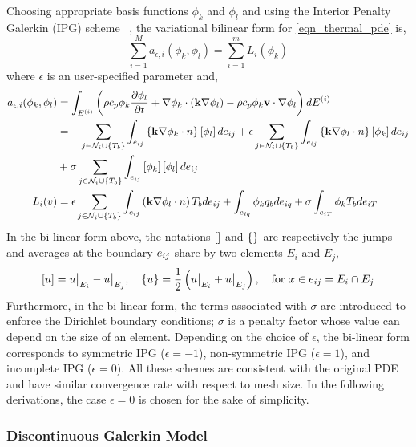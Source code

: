 Choosing appropriate basis functions $\phi_k$ and $\phi_l$ and using the Interior Penalty Galerkin (IPG) scheme ~\cite{Cohen and pernet 2018}, the variational bilinear form for \cref{eqn_thermal_pde} is,
\begin{equation}
    \sum_{i=1}^{M}a_{\epsilon,i}(\phi_k,\phi_l) = \sum_{i=1}^{m}L_i(\phi_k)
\end{equation}
where $\epsilon$ is an user-specified parameter and,
\begin{subequations}
    \begin{align}
        a_{\epsilon,i}(\phi_k,\phi_l) &= \int_{E^{(i)}}\left(\rho c_p \phi_k \frac{\partial \phi_l}{\partial t} + \nabla \phi_k\cdot\left(\mathbf{k}\nabla \phi_l\right) - \rho c_p \phi_k \mathbf{v}\cdot\nabla\phi_l\right)dE^{(i)}\\
        &= -\sum_{j\in\mathcal{N}_i\cup\left\{T_b\right\}}\int_{e_{ij}}\left\{\mathbf{k}\nabla\phi_k\cdot n\right\}\left[\phi_l\right]de_{ij} + \epsilon\sum_{j\in\mathcal{N}_i\cup\left\{T_b\right\}}\int_{e_{ij}}\left\{\mathbf{k}\nabla\phi_l\cdot n\right\}\left[\phi_k\right]de_{ij} \notag\\
        &+ \sigma\sum_{j\in\mathcal{N}_i\cup\left\{T_b\right\}}\int_{e_{ij}}\left[\phi_k\right]\left[\phi_l\right]de_{ij}\\
        L_i(v) &= \epsilon\sum_{j\in\mathcal{N}_i\cup\left\{T_b\right\}}\int_{e_{ij}}\left(\mathbf{k}\nabla\phi_l\cdot n\right)T_b de_{ij} + \int_{e_{iq}}\phi_k q_b de_{iq} + \sigma\int_{e_{iT}}\phi_k T_b de_{iT}
    \end{align}
\end{subequations}
In the bi-linear form above, the notations $\left[\right]$ and $\left\{\right\}$ are respectively the jumps and averages at the boundary $e_{ij}$ share by two elements $E_i$ and $E_j$,
\[
    \left[u\right] = u\big|_{E_i} - u\big|_{E_j},\quad \left\{u\right\} = \frac{1}{2}\left(u\big|_{E_i} + u\big|_{E_j}\right), \quad \text{for } x\in e_{ij} = E_i\cap E_j
\]
Furthermore, in the bi-linear form, the terms associated with $\sigma$ are introduced to enforce the Dirichlet boundary conditions; $\sigma$ is a penalty factor whose value can depend on the size of an element. Depending on the choice of $\epsilon$, the bi-linear form corresponds to symmetric IPG ($\epsilon=-1$), non-symmetric IPG ($\epsilon=1$), and incomplete IPG ($\epsilon=0$). All these schemes are consistent with the original PDE and have similar convergence rate with respect to mesh size. In the following derivations, the case $\epsilon=0$ is chosen for the sake of simplicity.

\subsubsection{Discontinuous Galerkin Model}

